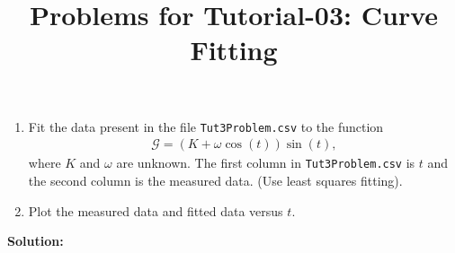 \documentclass[10pt,a4paper]{article}
\begin{document}
\title{Problems for Tutorial-03: Curve Fitting}
\date{}
\maketitle
\begin{enumerate}
\item Fit the data present in the file \verb'Tut3Problem.csv' to the function
\begin{align*}
	\mathcal{G} = \left(K + \omega \cos(t)\right)\sin(t), 
\end{align*}
where $K$ and $\omega$ are unknown. The first column 
in \verb'Tut3Problem.csv' is $t$ and the second column is the measured data. (Use least 
squares fitting).
\item Plot the measured data and fitted data versus $t$.
\end{enumerate}
{\bf Solution:}
\begin{figure}[ht!]
\end{figure}
\end{document}
